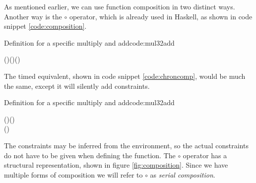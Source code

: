 As mentioned earlier, we can use function composition in two distinct ways.
Another way is the \ensuremath{\mathbin{\circ}} operator, which is already used in Haskell, as shown in code snippet \ref{code:composition}.
\begin{texexptitled}{Definition for a specific multiply and add}{code:mul32add}
\begin{hscode}\SaveRestoreHook
{}%
%
\>[B]{}(\mathbin{\circ})\mathbin{::}(\to {})\to (\to {})\to {}\to {}\<[E]%
\ColumnHook
\end{hscode}\resethooks
\end{texexptitled}

The timed equivalent, shown in code snippet \ref{code:chroncomp}, would be much the same, except it will silently add constraints. 
\begin{texexptitled}{Definition for a specific multiply and add}{code:mul32add}
\begin{hscode}\SaveRestoreHook
{}%
%
%
\>[B]{}(\mathbin{\circ}){}\<[9]%
\>[9]{}\mathbin{::}(\langle{}\rangle\to {}\langle{}\rangle){}\<[E]%
\\
\>[9]{}\to (\langle{}\rangle\to {}\langle{}\rangle){}\<[E]%
\\
\>[9]{}\to {}\langle{}\rangle\to {}\langle{}\rangle{}\<[E]%
\ColumnHook
\end{hscode}\resethooks
\end{texexptitled}
The constraints may be inferred from the environment, so the actual constraints do not have to be given when defining the function.
The \ensuremath{\mathbin{\circ}} operator has a structural representation, shown in figure \ref{fig:composition}.
Since we have multiple forms of composition we will refer to \ensuremath{\mathbin{\circ}} as \textit{serial composition}.
\begin{figure}
\centering
\footnotesize
{}
\end{figure}

